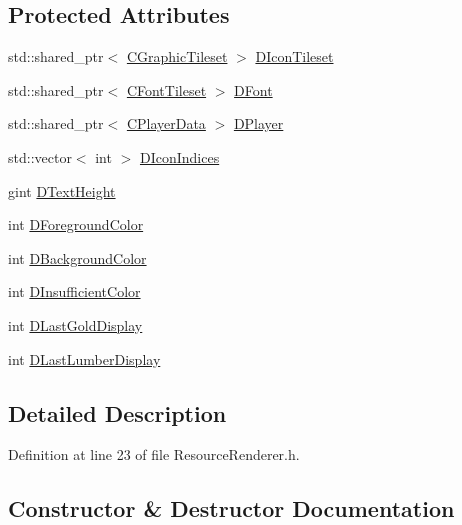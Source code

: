 \subsection*{Protected Attributes}
\begin{DoxyCompactItemize}
\item 
std\+::shared\+\_\+ptr$<$ \hyperlink{classCGraphicTileset}{C\+Graphic\+Tileset} $>$ \hyperlink{classCResourceRenderer_a6a4bc80e88c35798259d3235785a1a5f}{D\+Icon\+Tileset}
\item 
std\+::shared\+\_\+ptr$<$ \hyperlink{classCFontTileset}{C\+Font\+Tileset} $>$ \hyperlink{classCResourceRenderer_acd1383d226622757afdcdcf6d9747aa0}{D\+Font}
\item 
std\+::shared\+\_\+ptr$<$ \hyperlink{classCPlayerData}{C\+Player\+Data} $>$ \hyperlink{classCResourceRenderer_ad8479113a1d9b1ab1a134ca86bc823e0}{D\+Player}
\item 
std\+::vector$<$ int $>$ \hyperlink{classCResourceRenderer_a18c32c2685ee404dc0177b977fb2da59}{D\+Icon\+Indices}
\item 
gint \hyperlink{classCResourceRenderer_a7674293a7af59bfc3a75f57e729d9a6f}{D\+Text\+Height}
\item 
int \hyperlink{classCResourceRenderer_a8605027f29776f3042e1c3f9072d4390}{D\+Foreground\+Color}
\item 
int \hyperlink{classCResourceRenderer_a7985a8b9266542c506acc20b12e23ebb}{D\+Background\+Color}
\item 
int \hyperlink{classCResourceRenderer_a628700620a91412c1624fae0db8a9ebb}{D\+Insufficient\+Color}
\item 
int \hyperlink{classCResourceRenderer_ae96b899e2b8f19105a6e5d1e2f741abd}{D\+Last\+Gold\+Display}
\item 
int \hyperlink{classCResourceRenderer_a9e2658ecff79b486956e118114a2fb52}{D\+Last\+Lumber\+Display}
\end{DoxyCompactItemize}


\subsection{Detailed Description}


Definition at line 23 of file Resource\+Renderer.\+h.



\subsection{Constructor \& Destructor Documentation}
\hypertarget{classCResourceRenderer_a9deb259cfd2c01a87f9d4c5d57e962e1}{}\label{classCResourceRenderer_a9deb259cfd2c01a87f9d4c5d57e962e1} 
